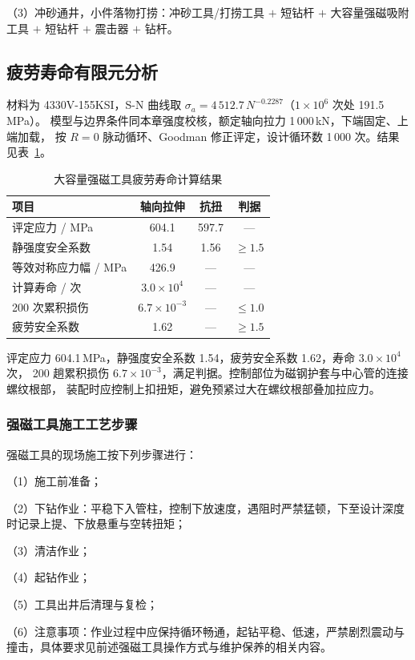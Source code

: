 （3）冲砂通井，小件落物打捞：冲砂工具/打捞工具 $+$ 短钻杆 $+$ 大容量强磁吸附工具 $+$ 短钻杆 $+$ 震击器 $+$ 钻杆。

\subsection{疲劳寿命有限元分析}
材料为 4330V-155KSI，S-N 曲线取 $\sigma_a=4\,512.7\,N^{-0.2287}$（$1\times10^{6}$ 次处 191.5\,MPa）。
模型与边界条件同本章强度校核，额定轴向拉力 1\,000\,kN，下端固定、上端加载，
按 $R=0$ 脉动循环、Goodman 修正评定，设计循环数 1\,000 次。结果见表~\ref{tab:fatigue_mag}。

\begin{table}[htbp]
\centering
\caption{大容量强磁工具疲劳寿命计算结果}
\label{tab:fatigue_mag}
\begin{tabular}{lccc}
\hline
项目 & 轴向拉伸 & 抗扭 & 判据 \\
\hline
评定应力 / MPa & 604.1 & 597.7 & --- \\
静强度安全系数 & 1.54 & 1.56 & $\ge 1.5$ \\
等效对称应力幅 / MPa & 426.9 & --- & --- \\
计算寿命 / 次 & $3.0\times10^{4}$ & --- & --- \\
200 次累积损伤 & $6.7\times10^{-3}$ & --- & $\le 1.0$ \\
疲劳安全系数 & 1.62 & --- & $\ge 1.5$ \\
\hline
\end{tabular}
\end{table}

评定应力 604.1\,MPa，静强度安全系数 1.54，疲劳安全系数 1.62，寿命 $3.0\times10^{4}$ 次，
200 趟累积损伤 $6.7\times10^{-3}$，满足判据。控制部位为磁钢护套与中心管的连接螺纹根部，
装配时应控制上扣扭矩，避免预紧过大在螺纹根部叠加拉应力。

\subsubsection{强磁工具施工工艺步骤}

强磁工具的现场施工按下列步骤进行：

（1）施工前准备；

（2）下钻作业：平稳下入管柱，控制下放速度，遇阻时严禁猛顿，下至设计深度时记录上提、下放悬重与空转扭矩；

（3）清洁作业；

（4）起钻作业；

（5）工具出井后清理与复检；

（6）注意事项：作业过程中应保持循环畅通，起钻平稳、低速，严禁剧烈震动与撞击，具体要求见前述强磁工具操作方式与维护保养的相关内容。




